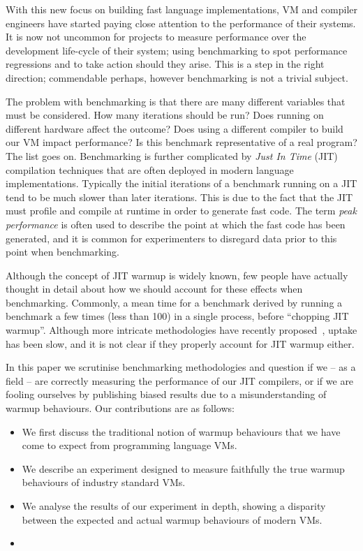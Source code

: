 \documentclass[10pt,preprint]{sigplanconf}
\begin{document}
With this new focus on building fast language implementations, VM and
compiler engineers have started paying close attention to the performance of
their systems. It is now not uncommon for projects to measure performance over
the development life-cycle of their system;  using benchmarking to spot
performance regressions and to take action should they arise. This is a step
in the right direction; commendable perhaps, however benchmarking is not a
trivial subject.

The problem with benchmarking is that there are many different variables that
must be considered. How many iterations should be run? Does running on
different hardware affect the outcome? Does using a different compiler to build
our VM impact performance? Is this benchmark representative of a real program?
The list goes on. Benchmarking is further complicated by \emph{Just In Time}
(JIT) compilation techniques that are often deployed in modern language
implementations. Typically the initial iterations of a benchmark running on a
JIT tend to be much slower than later iterations. This is due to the fact that
the JIT must profile and compile at runtime in order to generate fast code.
The term \emph{peak performance} is often used to describe the point at which
the fast code has been generated, and it is common for experimenters to
disregard data prior to this point when benchmarking.

Although the concept of JIT warmup is widely known, few people have actually
thought in detail about how we should account for these effects when
benchmarking. Commonly, a mean time for a benchmark derived by running a
benchmark a few times (less than 100) in a single process, before ``chopping
JIT warmup''. Although more intricate methodologies have recently
proposed~\cite{XXX}, uptake has been slow, and it is not clear if they
properly account for JIT warmup either.

In this paper we scrutinise benchmarking methodologies and question if we --
as a field -- are correctly measuring the performance of our JIT compilers,
or if we are fooling ourselves by publishing biased results due to a
misunderstanding of warmup behaviours. Our contributions are as follows:

\begin{itemize}
\item We first discuss the traditional notion of warmup behaviours that we have
come to expect from programming language VMs.
\item We describe an experiment designed to measure faithfully the true
warmup behaviours of industry standard VMs.
\item We analyse the results of our experiment in depth, showing a disparity
between the expected and actual warmup behaviours of modern VMs.
\item {}
\end{itemize}
\end{document}
